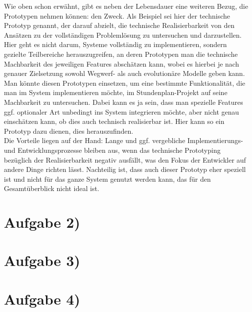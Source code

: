 \documentclass{swp1}
\begin{document}
Wie oben schon erwähnt, gibt es neben der Lebensdauer eine weiteren Bezug, die Prototypen nehmen können: den Zweck. Als Beispiel sei hier der technische Prototyp genannt, der darauf abzielt, die technische Realisierbarkeit von den Ansätzen zu der vollständigen Problemlösung zu untersuchen und darzustellen. Hier geht es nicht darum, Systeme vollständig zu implementieren, sondern gezielte Teilbereiche herauszugreifen, an deren Prototypen man die technische Machbarkeit des jeweiligen Features abschätzen kann, wobei es  hierbei je nach genauer Zielsetzung sowohl Wegwerf- als auch evolutionäre Modelle geben kann. \\
Man könnte diesen Prototypen einsetzen, um eine bestimmte Funktionalität, die man im System implementieren möchte, im Stundenplan-Projekt auf seine Machbarkeit zu untersuchen. Dabei kann es ja sein, dass man spezielle Features ggf. optionaler Art unbedingt ins System integrieren möchte, aber nicht genau einschätzen kann, ob dies auch technisch realisierbar ist. Hier kann so ein Prototyp dazu dienen, dies herauszufinden.\\
Die Vorteile liegen auf der Hand: Lange und ggf. vergebliche Implementierungs- und Entwicklungsprozesse bleiben aus, wenn das technische Prototyping bezüglich der Realisierbarkeit negativ ausfällt, was den Fokus der Entwickler auf andere Dinge richten lässt. Nachteilig ist, dass auch dieser Prototyp eher speziell ist und nicht für das ganze System genutzt werden kann, das für den Gesamtüberblick nicht ideal ist. 
   

\section*{Aufgabe 2)}
\section*{Aufgabe 3)}
\section*{Aufgabe 4)}
\end{document}
